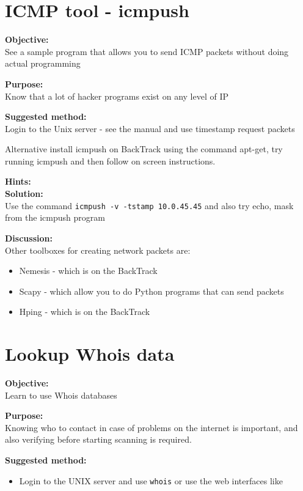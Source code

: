\documentclass[a4paper,11pt,notitlepage]{report}
\begin{document}
\chapter{ICMP tool - icmpush}
\label{ex:icmpush}

{\bf Objective:} \\
See a sample program that allows you to send ICMP packets without doing actual programming

{\bf Purpose:}\\
Know that a lot of hacker programs exist on any level of IP

{\bf Suggested method:} \\
Login to the Unix server - see the manual and use timestamp request packets

Alternative install icmpush on BackTrack using the command apt-get, try running icmpush and
then follow on screen instructions.

{\bf Hints:} \\

{\bf Solution:}\\
Use the command \verb+icmpush -v -tstamp 10.0.45.45+
and also try echo, mask from the icmpush program

{\bf Discussion:}\\
Other toolboxes for creating network packets are:
\begin{itemize}
\item Nemesis - which is on the BackTrack
\item Scapy - which allow you to do Python programs that can send packets
\item Hping - which is on the BackTrack
\end{itemize}

\chapter{Lookup Whois data}
\label{ex:whois}


{\bf Objective:} \\
Learn to use Whois databases

{\bf Purpose:}\\
Knowing who to contact in case of problems on the internet is important, and also verifying before starting scanning is required.

{\bf Suggested method:}\\
\begin{itemize}
\item Login to the UNIX server and use \verb+whois+ or use the web interfaces
like \\ 
\end{itemize}
\end{document}
